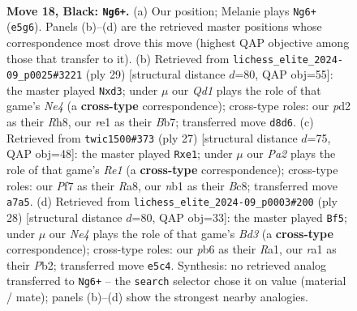 \documentclass[11pt]{article}
\begin{document}
\clearpage

\begin{figure}[p]\centering
\begin{subfigure}{0.46\textwidth}\centering
\resizebox{\linewidth}{!}{%
\newchessgame
\chessboard[
  setfen={rbbqr1k1/pp3ppp/1P2p3/4n3/3p2P1/1P4KB/P2P1P1P/RNBQR3 b - - 0 18},
  showmover=false,
  pgfstyle=straightmove, color=movearrow, markmove={e5-g6}
]}
\caption{}
\end{subfigure}\hfill
\begin{subfigure}{0.46\textwidth}\centering
\resizebox{\linewidth}{!}{%
\newchessgame
\chessboard[
  setfen={r3kb1r/1bq2ppp/p3P3/2p1n3/1p2N3/3BP3/PP2QPPP/R1B2RK1 b kq - 1 15},
  showmover=false,
  pgfstyle=straightmove, color=movearrow, markmove={e5-d3}
]}
\caption{}
\end{subfigure}
\\[4pt]
\begin{subfigure}{0.46\textwidth}\centering
\resizebox{\linewidth}{!}{%
\newchessgame
\chessboard[
  setfen={r1bqr1k1/pp3ppp/2p2b2/P2p1n2/3P1B2/2P5/1P3PPP/RN1QRBK1 b - - 2 14},
  showmover=false,
  pgfstyle=straightmove, color=movearrow, markmove={e8-e1}
]}
\caption{}
\end{subfigure}\hfill
\begin{subfigure}{0.46\textwidth}\centering
\resizebox{\linewidth}{!}{%
\newchessgame
\chessboard[
  setfen={2bqkb1r/r4ppp/p1p5/1pnpP3/8/2NBP3/PPQ2PPP/R1B2RK1 w k - 0 15},
  showmover=false,
  pgfstyle=straightmove, color=movearrow, markmove={d3-f5}
]}
\caption{}
\end{subfigure}
\caption{\textbf{Move 18, Black: \texttt{Ng6+}.} (a) Our position; Melanie plays \texttt{Ng6+} (\texttt{e5g6}). Panels (b)--(d) are the retrieved master positions whose correspondence most drove this move (highest QAP objective among those that transfer to it). (b) Retrieved from \texttt{lichess\_elite\_2024-09\_p0025\#3221} (ply 29) [structural distance $d$=80, QAP obj=55]: the master played \texttt{Nxd3}; under $\mu$ our \emph{Qd1} plays the role of that game's \emph{Ne4} (a \textbf{cross-type} correspondence); cross-type roles: our \emph{p}d2 as their \emph{R}h8, our \emph{r}e1 as their \emph{B}b7; transferred move \texttt{d8d6}. (c) Retrieved from \texttt{twic1500\#373} (ply 27) [structural distance $d$=75, QAP obj=48]: the master played \texttt{Rxe1}; under $\mu$ our \emph{Pa2} plays the role of that game's \emph{Re1} (a \textbf{cross-type} correspondence); cross-type roles: our \emph{P}f7 as their \emph{R}a8, our \emph{n}b1 as their \emph{B}c8; transferred move \texttt{a7a5}. (d) Retrieved from \texttt{lichess\_elite\_2024-09\_p0003\#200} (ply 28) [structural distance $d$=80, QAP obj=33]: the master played \texttt{Bf5}; under $\mu$ our \emph{Ne4} plays the role of that game's \emph{Bd3} (a \textbf{cross-type} correspondence); cross-type roles: our \emph{p}b6 as their \emph{R}a1, our \emph{r}a1 as their \emph{P}b2; transferred move \texttt{e5c4}. Synthesis: no retrieved analog transferred to \texttt{Ng6+} -- the \texttt{search} selector chose it on value (material / mate); panels (b)--(d) show the strongest nearby analogies.}
\label{fig:thought-m35}
\end{figure}
\end{document}

